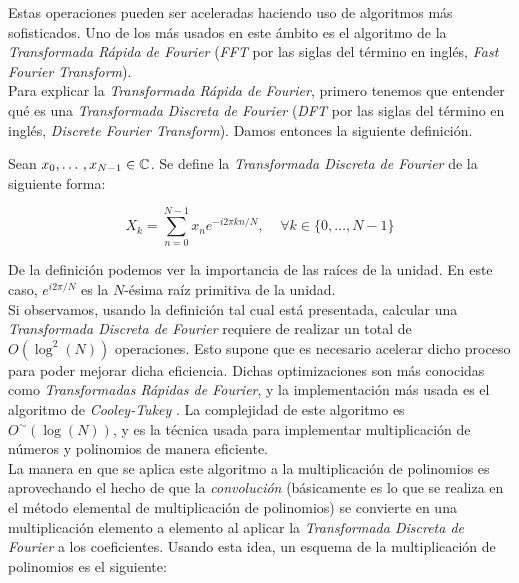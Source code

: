 Estas operaciones pueden ser aceleradas haciendo uso de algoritmos más sofisticados. Uno de los más usados en este ámbito es el algoritmo de la \textit{Transformada Rápida de Fourier} (\textit{FFT} por las siglas del término en inglés, \textit{Fast Fourier Transform}).\\

Para explicar la \textit{Transformada Rápida de Fourier}, primero tenemos que entender qué es una \textit{Transformada Discreta de Fourier} (\textit{DFT} por las siglas del término en inglés, \textit{Discrete Fourier Transform}). Damos entonces la siguiente definición.

\begin{definicion}
	Sean $x_0,\dotso,x_{N-1} \in \mathbb{C}$. Se define la \textit{Transformada Discreta de Fourier} de la siguiente forma:
	
	\begin{equation}
	X_k = \sum_{n=0}^{N-1}x_ne^{-i2\pi kn / N},\;\;\;\;\forall k \in \{0,\dotso,N-1\}
	\end{equation}
\end{definicion}

De la definición podemos ver la importancia de las raíces de la unidad. En este caso, $e^{i2\pi/N}$ es la $N$-ésima raíz primitiva de la unidad.\\

Si observamos, usando la definición tal cual está presentada, calcular una \textit{Transformada Discreta de Fourier} requiere de realizar un total de $O(\log^2(N))$ operaciones. Esto supone que es necesario acelerar dicho proceso para poder mejorar dicha eficiencia. Dichas optimizaciones son más conocidas como \textit{Transformadas Rápidas de Fourier}, y la implementación más usada es el algoritmo de \textit{Cooley-Tukey} \cite{cooley_tukey_1969}. La complejidad de este algoritmo es $O^\sim(\log(N))$, y es la técnica usada para implementar multiplicación de números y polinomios de manera eficiente.\\

La manera en que se aplica este algoritmo a la multiplicación de polinomios es aprovechando el hecho de que la \textit{convolución} (básicamente es lo que se realiza en el método elemental de multiplicación de polinomios) se convierte en una multiplicación elemento a elemento al aplicar la \textit{Transformada Discreta de Fourier} a los coeficientes. Usando esta idea, un esquema de la multiplicación de polinomios es el siguiente:

